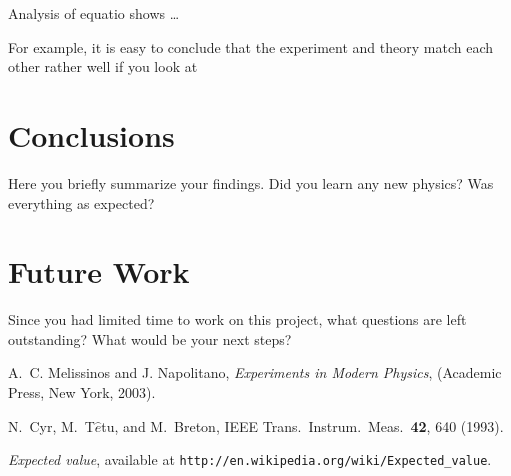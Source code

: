 Analysis of equatio shows \ldots

\blindtext

For example, it is easy to conclude that the
experiment and theory match each other rather well if you look at


\section{Conclusions}
Here you briefly summarize your findings. Did you learn any new physics? Was everything as expected?

\blindtext

\section{Future Work}
Since you had limited time to work on this project, what questions are left outstanding? What would be your next steps?

\blindtext


\begin{thebibliography}{99}

  A.~C. Melissinos and J. Napolitano, \textit{Experiments in Modern Physics},
  (Academic Press, New York, 2003).

  N.\ Cyr, M.\ T$\hat{e}$tu, and M.\ Breton,
  IEEE Trans.\ Instrum.\ Meas.\ \textbf{42}, 640 (1993).

   \emph{Expected value},  available at
  \texttt{http://en.wikipedia.org/wiki/Expected\_value}.

\end{thebibliography}


